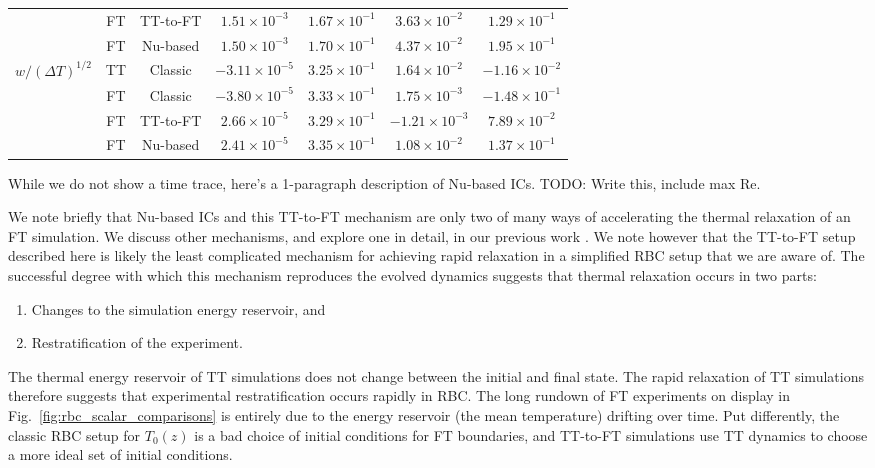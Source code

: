 \documentclass[aps, pre, onecolumn, nofootinbib, notitlepage, groupedaddress, amsfonts, amssymb, amsmath, longbibliography, superscriptaddress]{revtex4-1}
\newcommand{\ea}[1]{{\color{red} #1}}
\begin{document}
\begin{table}[b!]
\begin{center}
\begin{tabular}{c c c c c c c}
						&	FT	& TT-to-FT	&	$1.51 \times 10^{-3}$	&	$1.67 \times 10^{-1}$	&	$3.63 \times 10^{-2}$	&	$1.29  \times 10^{-1}$ \\
						&	FT	& Nu-based	&	$1.50 \times 10^{-3}$	&	$1.70 \times 10^{-1}$	&	$4.37 \times 10^{-2}$	&	$1.95  \times 10^{-1}$ \\
\hline                                                                                                                    
$w/(\Delta T)^{1/2}$ 	&	TT	& Classic	&	$-3.11 \times 10^{-5}$	&	$3.25 \times 10^{-1}$	&	$1.64 \times 10^{-2}$	&	$-1.16 \times 10^{-2}$ \\
						&	FT	& Classic	&	$-3.80 \times 10^{-5}$	&	$3.33 \times 10^{-1}$	&	$1.75 \times 10^{-3}$	&	$-1.48 \times 10^{-1}$ \\
						&	FT	& TT-to-FT	&	$2.66  \times 10^{-5}$	&	$3.29 \times 10^{-1}$	&	$-1.21 \times 10^{-3}$	&	$7.89  \times 10^{-2}$ \\
						&	FT	& Nu-based	&	$2.41  \times 10^{-5}$	&	$3.35 \times 10^{-1}$	&	$1.08 \times 10^{-2}$	&	$1.37  \times 10^{-1}$ \\
\hline																	
\end{tabular}
\end{center}
\end{table}


\ea{
While we do not show a time trace, here's a 1-paragraph description of Nu-based ICs.
TODO: Write this, include max Re.
}


We note briefly that \ea{Nu-based ICs and} this TT-to-FT mechanism \ea{are} only \ea{two} of many ways of accelerating the thermal relaxation of an FT simulation.
We discuss other mechanisms, and explore one in detail, in our previous work \cite{anders&all2018}.
We note however that the TT-to-FT setup described here is likely the least complicated mechanism for achieving rapid relaxation in a simplified RBC setup that we are aware of.
The successful degree with which this mechanism reproduces the evolved dynamics suggests that thermal relaxation occurs in two parts:
\begin{enumerate}
\item Changes to the simulation energy reservoir, and
\item Restratification of the experiment.
\end{enumerate}
The thermal energy reservoir of TT simulations does not change between the initial and final state.
The rapid relaxation of TT simulations therefore suggests that experimental restratification occurs rapidly in RBC. 
The long rundown of FT experiments on display in Fig.~\ref{fig:rbc_scalar_comparisons} is entirely due to the energy reservoir (the mean temperature) drifting over time.
Put differently, the classic RBC setup for $T_0(z)$ is a bad choice of initial conditions for FT boundaries, and TT-to-FT simulations use TT dynamics to choose a more ideal set of initial conditions.
\end{document}
